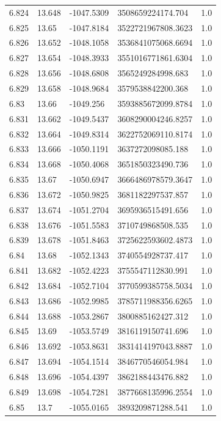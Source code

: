 \begin{tabular}{lllll}
6.824 & 13.648 & -1047.5309 & 3508659224174.704 & 1.0 \\
6.825 & 13.65 & -1047.8184 & 3522721967808.3623 & 1.0 \\
6.826 & 13.652 & -1048.1058 & 3536841075068.6694 & 1.0 \\
6.827 & 13.654 & -1048.3933 & 3551016771861.6304 & 1.0 \\
6.828 & 13.656 & -1048.6808 & 3565249284998.683 & 1.0 \\
6.829 & 13.658 & -1048.9684 & 3579538842200.368 & 1.0 \\
6.83 & 13.66 & -1049.256 & 3593885672099.8784 & 1.0 \\
6.831 & 13.662 & -1049.5437 & 3608290004246.8257 & 1.0 \\
6.832 & 13.664 & -1049.8314 & 3622752069110.8174 & 1.0 \\
6.833 & 13.666 & -1050.1191 & 3637272098085.188 & 1.0 \\
6.834 & 13.668 & -1050.4068 & 3651850323490.736 & 1.0 \\
6.835 & 13.67 & -1050.6947 & 3666486978579.3647 & 1.0 \\
6.836 & 13.672 & -1050.9825 & 3681182297537.857 & 1.0 \\
6.837 & 13.674 & -1051.2704 & 3695936515491.656 & 1.0 \\
6.838 & 13.676 & -1051.5583 & 3710749868508.535 & 1.0 \\
6.839 & 13.678 & -1051.8463 & 3725622593602.4873 & 1.0 \\
6.84 & 13.68 & -1052.1343 & 3740554928737.417 & 1.0 \\
6.841 & 13.682 & -1052.4223 & 3755547112830.991 & 1.0 \\
6.842 & 13.684 & -1052.7104 & 3770599385758.5034 & 1.0 \\
6.843 & 13.686 & -1052.9985 & 3785711988356.6265 & 1.0 \\
6.844 & 13.688 & -1053.2867 & 3800885162427.312 & 1.0 \\
6.845 & 13.69 & -1053.5749 & 3816119150741.696 & 1.0 \\
6.846 & 13.692 & -1053.8631 & 3831414197043.8887 & 1.0 \\
6.847 & 13.694 & -1054.1514 & 3846770546054.984 & 1.0 \\
6.848 & 13.696 & -1054.4397 & 3862188443476.882 & 1.0 \\
6.849 & 13.698 & -1054.7281 & 3877668135996.2554 & 1.0 \\
6.85 & 13.7 & -1055.0165 & 3893209871288.541 & 1.0 \\

\end{tabular}
